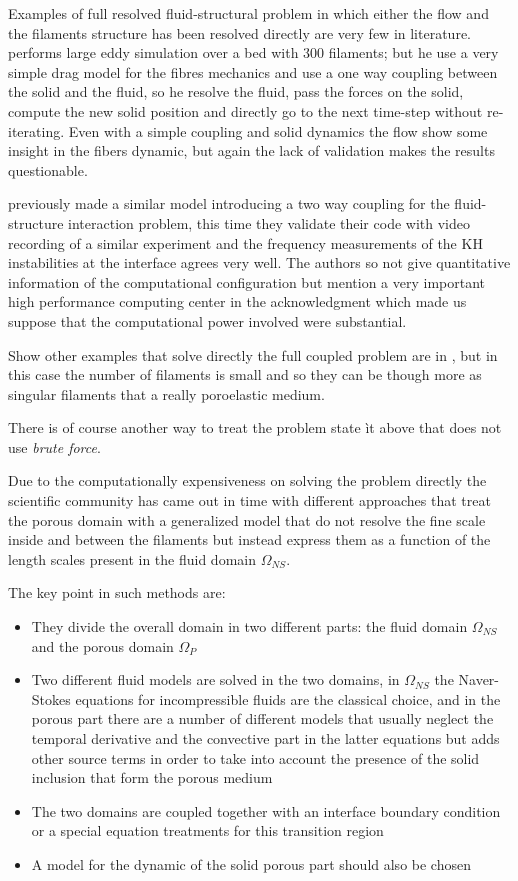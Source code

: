 Examples of full resolved fluid-structural problem in which either the flow and the filaments structure has been resolved directly are very few in literature.
\citet{marjoribanks2017does} performs large eddy simulation over a bed with $300$ filaments; but he use a very simple drag model for the fibres mechanics and use a one way coupling between the solid and the fluid, so he resolve the fluid, pass the forces on the solid, compute the new solid position and directly go to the next time-step without re-iterating.
Even with a simple coupling and solid dynamics the flow show some insight in the fibers dynamic, but again the lack of validation makes the results questionable.

\citet{dupont2010modelling} previously made a similar model introducing a two way coupling for the fluid-structure interaction problem, this time they validate their code with video recording of a similar experiment and the frequency measurements of the KH instabilities at the interface agrees very well.
The authors so not give quantitative information of the computational configuration but mention a very important high performance computing center in the acknowledgment which made us suppose that the computational power involved were substantial.

Show other examples that solve directly the full coupled problem are in \citet{pinelli2017pelskin} \citet{favier2017pelskin}, \citet{revell2017pelskin} but in this case the number of filaments is small and so they can be though more as singular filaments that a really poroelastic medium.

There is of course another way to treat the problem state ìt above that does not use \textit{brute force}.

Due to the computationally expensiveness on solving the problem directly the scientific community has came out in time with different approaches that treat the porous domain with a generalized model that do not resolve the fine scale inside and between the filaments but instead express them as a function of the length scales present in the fluid domain $\Omega_{NS}$.

The key point in such methods are:
\begin{itemize}
	\item They divide the overall domain in two different parts: the fluid domain $\Omega_{NS}$ and the porous domain $\Omega_{P}$
	\item Two different fluid models are solved in the two domains, in $\Omega_{NS}$ the Naver-Stokes equations for incompressible fluids are the classical choice, and in the porous part there are a number of different models that usually neglect the temporal derivative and the convective part in the latter equations but adds other source terms in order to take into account the presence of the solid inclusion that form the porous medium
	\item The two domains are coupled together with an interface boundary condition or a special equation treatments for this transition region
	\item A model for the dynamic of the solid porous part should also be chosen
\end{itemize}

